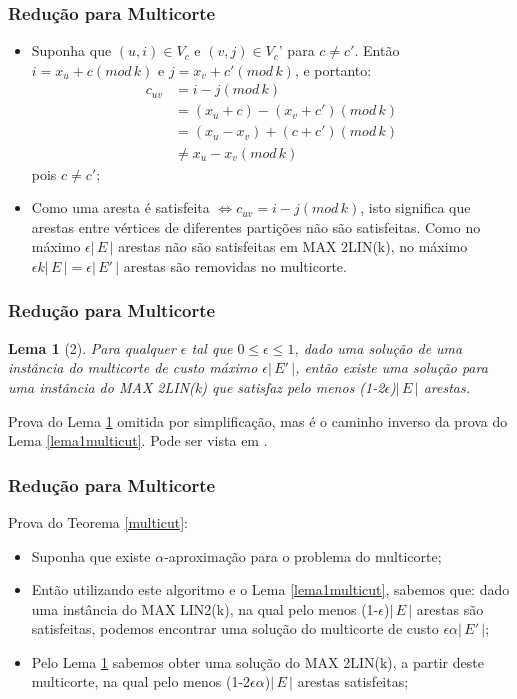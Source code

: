 \documentclass[11pt, handout]{beamer}
\newtheorem{lema}{Lema}
\begin{document}
\begin{frame}[<+->]
    \frametitle{Redução para Multicorte}
        \begin{itemize}
            \item Suponha que $(u,i) \in V_c$ e $(v,j) \in V_c$' para $c \ne c'$. Então $i=x_u+c(mod\,k)$ e $j=x_v+c'(mod\,k)$, e portanto:
            \begin{align*}
                c_{uv} &= i-j(mod\,k) \\
                       &= (x_u+c)-(x_v+c')(mod\,k) \\
                       &= (x_u-x_v)+(c+c')(mod\,k) \\
                       &\ne x_u-x_v(mod\,k)
            \end{align*}
            pois $c \ne c'$;
            \item Como uma aresta é satisfeita $\iff c_{uv} = i-j(mod\,k)$, isto significa que arestas entre vértices de diferentes partições não são satisfeitas. Como no máximo $\epsilon|\,E\,|$ arestas não são satisfeitas em MAX 2LIN(k), no máximo $\epsilon k|\,E\,| = \epsilon|\,E'\,|$ arestas são removidas no multicorte.
        \end{itemize}
\end{frame}{}

\begin{frame}[<+->]
    \frametitle{Redução para Multicorte}
     \begin{lema}[2] \label{lema2multicut}
        Para qualquer $\epsilon$ tal que $0 \le \epsilon \le 1$, dado uma solução de uma instância do multicorte de custo máximo $\epsilon|\,E'\,|$, então existe uma solução para uma instância do MAX 2LIN(k) que satisfaz pelo menos (1-2$\epsilon$)$|\,E\,|$ arestas.
    \end{lema}
    Prova do Lema \ref{lema2multicut} omitida por simplificação, mas é o caminho inverso da prova do Lema \ref{lema1multicut}. Pode ser vista em \cite{design_approx_algs}.
\end{frame}{}

\begin{frame}[<+->]
    \frametitle{Redução para Multicorte}
    Prova do Teorema \ref{multicut}:
    \begin{itemize}
        \item Suponha que existe $\alpha$-aproximação para o problema do multicorte;
        \item Então utilizando este algoritmo e o Lema \ref{lema1multicut}, sabemos que: dado uma instância do MAX LIN2(k), na qual pelo menos (1-$\epsilon$)$|\,E\,|$ arestas são satisfeitas, podemos encontrar uma solução do multicorte de custo $\epsilon \alpha|\,E'\,|$;
        \item Pelo Lema \ref{lema2multicut} sabemos obter uma solução do MAX 2LIN(k), a partir deste multicorte, na qual pelo menos (1-2$\epsilon \alpha$)$|\,E\,|$ arestas satisfeitas;
    \end{itemize}
\end{frame}{}
\end{document}
